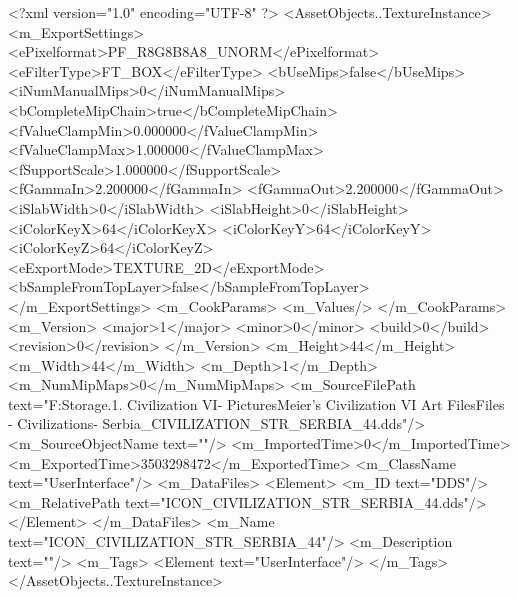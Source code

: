 <?xml version="1.0" encoding="UTF-8" ?>
<AssetObjects..TextureInstance>
	<m_ExportSettings>
		<ePixelformat>PF_R8G8B8A8_UNORM</ePixelformat>
		<eFilterType>FT_BOX</eFilterType>
		<bUseMips>false</bUseMips>
		<iNumManualMips>0</iNumManualMips>
		<bCompleteMipChain>true</bCompleteMipChain>
		<fValueClampMin>0.000000</fValueClampMin>
		<fValueClampMax>1.000000</fValueClampMax>
		<fSupportScale>1.000000</fSupportScale>
		<fGammaIn>2.200000</fGammaIn>
		<fGammaOut>2.200000</fGammaOut>
		<iSlabWidth>0</iSlabWidth>
		<iSlabHeight>0</iSlabHeight>
		<iColorKeyX>64</iColorKeyX>
		<iColorKeyY>64</iColorKeyY>
		<iColorKeyZ>64</iColorKeyZ>
		<eExportMode>TEXTURE_2D</eExportMode>
		<bSampleFromTopLayer>false</bSampleFromTopLayer>
	</m_ExportSettings>
	<m_CookParams>
		<m_Values/>
	</m_CookParams>
	<m_Version>
		<major>1</major>
		<minor>0</minor>
		<build>0</build>
		<revision>0</revision>
	</m_Version>
	<m_Height>44</m_Height>
	<m_Width>44</m_Width>
	<m_Depth>1</m_Depth>
	<m_NumMipMaps>0</m_NumMipMaps>
	<m_SourceFilePath text="F:\Mod Storage\2.1. Civilization VI\Mods\Archive - Pictures\Sid Meier's Civilization VI Art Files\Art Files - Civilizations\Civilization - Serbia\ICON_CIVILIZATION_STR_SERBIA_44.dds"/>
	<m_SourceObjectName text=""/>
	<m_ImportedTime>0</m_ImportedTime>
	<m_ExportedTime>3503298472</m_ExportedTime>
	<m_ClassName text="UserInterface"/>
	<m_DataFiles>
		<Element>
			<m_ID text="DDS"/>
			<m_RelativePath text="ICON_CIVILIZATION_STR_SERBIA_44.dds"/>
		</Element>
	</m_DataFiles>
	<m_Name text="ICON_CIVILIZATION_STR_SERBIA_44"/>
	<m_Description text=""/>
	<m_Tags>
		<Element text="UserInterface"/>
	</m_Tags>
</AssetObjects..TextureInstance>

